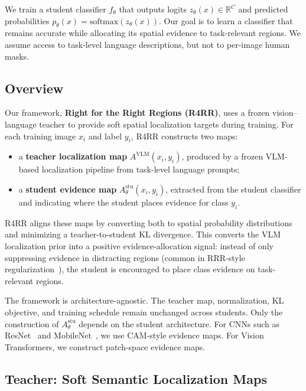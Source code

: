 We train a student classifier $f_\theta$ that outputs logits $z_\theta(x)\in\mathbb{R}^{C}$ and predicted probabilities $p_\theta(x)=\mathrm{softmax}(z_\theta(x))$. Our goal is to learn a classifier that remains accurate while allocating its spatial evidence to task-relevant regions. We assume access to task-level language descriptions, but not to per-image human masks.

\subsection{Overview}
\label{sec:overview}

Our framework, \textbf{Right for the Right Regions (R4RR)}, uses a frozen vision--language teacher to provide soft spatial localization targets during training. For each training image $x_i$ and label $y_i$, R4RR constructs two maps:
\begin{itemize}
\item a \textbf{teacher localization map} $A^{\mathrm{VLM}}(x_i,y_i)$, produced by a frozen VLM-based localization pipeline from task-level language prompts;
\item a \textbf{student evidence map} $A^{\mathrm{stu}}_\theta(x_i,y_i)$, extracted from the student classifier and indicating where the student places evidence for class $y_i$.
\end{itemize}

R4RR aligns these maps by converting both to spatial probability distributions and minimizing a teacher-to-student KL divergence. This converts the VLM localization prior into a positive evidence-allocation signal: instead of only suppressing evidence in distracting regions (common in RRR-style regularization~\cite{ross2017right}), the student is encouraged to place class evidence on task-relevant regions.

The framework is architecture-agnostic. The teacher map, normalization, KL objective, and training schedule remain unchanged across students. Only the construction of $A^{\mathrm{stu}}_\theta$ depends on the student architecture. For CNNs such as ResNet~\cite{he2016deep} and MobileNet~\cite{howard2017mobilenets}, we use CAM-style evidence maps. For Vision Transformers, we construct patch-space evidence maps.

\subsection{Teacher: Soft Semantic Localization Maps}
\label{sec:teacher}

